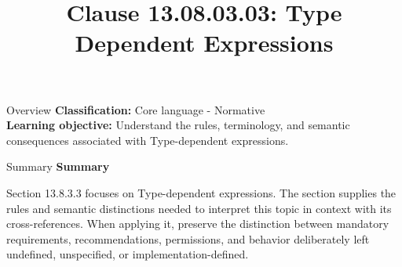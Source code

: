 \documentclass[10pt,letterpaper]{article}
\title{Clause 13.08.03.03: Type Dependent Expressions}
\author{}
\date{}
\begin{document}
\maketitle
\begin{CornellOverviewBox}{Overview}
\textbf{Classification:} Core language - Normative\\[2pt]
\textbf{Learning objective:} Understand the rules, terminology, and semantic consequences associated with Type-dependent expressions.
\end{CornellOverviewBox}\begin{CornellSummaryBox}{Summary}
{\sffamily\bfseries\color{Accent} Summary}\par\vspace{3pt}Section 13.8.3.3 focuses on Type-dependent expressions. The section supplies the rules and semantic distinctions needed to interpret this topic in context with its cross-references. When applying it, preserve the distinction between mandatory requirements, recommendations, permissions, and behavior deliberately left undefined, unspecified, or implementation-defined.
\end{CornellSummaryBox}
\end{document}
